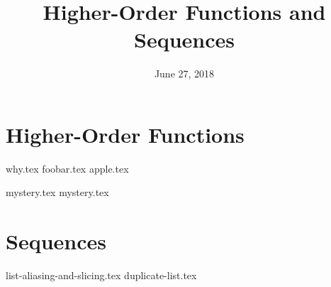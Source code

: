 \documentclass{exam}
\title{Higher-Order Functions and Sequences}
\date{June 27, 2018}
\begin{document}
\maketitle

\section{Higher-Order Functions}
\begin{questions}
{why.tex}
{foobar.tex}
{apple.tex}
\clearpage

{mystery.tex}
{mystery.tex}
\clearpage

\section{Sequences}
{list-aliasing-and-slicing.tex}
{duplicate-list.tex}

\end{questions}
\end{document}
